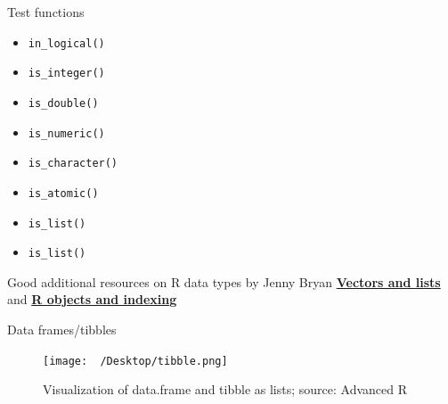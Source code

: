 \documentclass[
  ignorenonframetext,
]{beamer}
\providecommand{\tightlist}{%
  \setlength{\itemsep}{0pt}\setlength{\parskip}{0pt}}\usepackage{longtable,booktabs,array}
\begin{document}
\begin{frame}[fragile]{Test functions}
\protect\hypertarget{test-functions}{}
\begin{itemize}
\tightlist
\item
  \texttt{in\_logical()}
\item
  \texttt{is\_integer()}
\item
  \texttt{is\_double()}
\item
  \texttt{is\_numeric()}
\item
  \texttt{is\_character()}
\item
  \texttt{is\_atomic()}
\item
  \texttt{is\_list()}
\item
  \texttt{is\_list()}
\end{itemize}

\begin{tcolorbox}[enhanced jigsaw, breakable, opacityback=0, toprule=.15mm, colframe=quarto-callout-tip-color-frame, leftrule=.75mm, colback=white, arc=.35mm, rightrule=.15mm, bottomrule=.15mm, left=2mm]
\begin{minipage}[t]{5.5mm}
\textcolor{quarto-callout-tip-color}{\faLightbulb}
\end{minipage}%
\begin{minipage}[t]{\textwidth - 5.5mm}
Good additional resources on R data types by Jenny Bryan
\href{https://jennybc.github.io/purrr-tutorial/bk00_vectors-and-lists.html}{\textbf{Vectors
and lists}} and \href{https://stat545.com/r-objects.html}{\textbf{R
objects and indexing}}\end{minipage}%
\end{tcolorbox}
\end{frame}

\begin{frame}{Data frames/tibbles}
\protect\hypertarget{data-framestibbles}{}
\begin{figure}

{\centering \texttt{[image: ~/Desktop/tibble.png]}

}

\caption{Visualization of data.frame and tibble as lists; source:
Advanced R}

\end{figure}
\end{frame}
\end{document}
